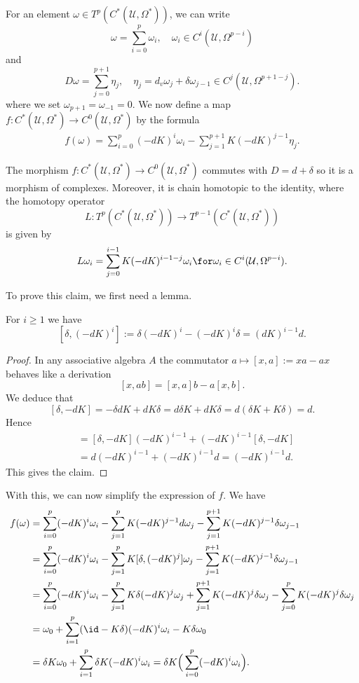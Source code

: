 For an element $\omega\in T^p(C^*(\mathcal{U},\Omega^*))$, we can write
\[\omega=\sum_{i=0}^{p}\omega_i,\quad \omega_i\in C^i(\mathcal{U},\Omega^{p-i})\]
and
\[D\omega=\sum_{j=0}^{p+1}\eta_j,\quad \eta_j=d_v\omega_j+\delta\omega_{j-1}\in C^j(\mathcal{U},\Omega^{p+1-j}).\]
where we set $\omega_{p+1}=\omega_{-1}=0$. We now define a map $f:C^*(\mathcal{U},\Omega^*)\to C^0(\mathcal{U},\Omega^*)$ by the formula
\begin{align}\label{collating formula def}
f(\omega)=\sum_{i=0}^{p}(-dK)^i\omega_i-\sum_{j=1}^{p+1}K(-dK)^{j-1}\eta_j.
\end{align}
\begin{proposition}\label{Cech de Rham collating formula}
The morphism $f:C^*(\mathcal{U},\Omega^*)\to C^0(\mathcal{U},\Omega^*)$ commutes with $D=d+\delta$ so it is a morphism of complexes. Moreover, it is chain homotopic to 
the identity, where the homotopy operator
\[L:T^p(C^*(\mathcal{U},\Omega^*))\to T^{p-1}(C^*(\mathcal{U},\Omega^*))\]
is given by
\[L\omega_i=\sum_{j=0}^{i-1}K(-dK)^{i-1-j}\omega_i\for \omega_i\in C^i(\mathcal{U},\Omega^{p-i}).\]
\end{proposition}
To prove this claim, we first need a lemma.
\begin{lemma}\label{collating formula lemma}
For $i\geq 1$ we have
\[[\delta,(-dK)^i]:=\delta(-dK)^i-(-dK)^i\delta=(dK)^{i-1}d.\]
\end{lemma}
\begin{proof}
In any associative algebra $A$ the commutator $a\mapsto[x,a]:=xa-ax$ behaves like a derivation
\[[x,ab]=[x,a]b-a[x,b].\]
We deduce that
\[[\delta,-dK]=-\delta dK+dK\delta=d\delta K+dK\delta=d(\delta K+K\delta)=d.\]
Hence
\begin{align*}
[\delta,(-dK)^i]&=[\delta,-dK](-dK)^{i-1}+(-dK)^{i-1}[\delta,-dK]\\
&=d(-dK)^{i-1}+(-dK)^{i-1}d=(-dK)^{i-1}d.
\end{align*}
This gives the claim.
\end{proof}
With this, we can now simplify the expression of $f$. We have
\begin{align*}
f(\omega)&=\sum_{i=0}^{p}(-dK)^i\omega_i-\sum_{j=1}^{p}K(-dK)^{j-1}d\omega_j-\sum_{j=1}^{p+1}K(-dK)^{j-1}\delta\omega_{j-1}\\
&=\sum_{i=0}^{p}(-dK)^i\omega_i-\sum_{j=1}^{p}K[\delta,(-dK)^j]\omega_j-\sum_{j=1}^{p+1}K(-dK)^{j-1}\delta\omega_{j-1}\\
&=\sum_{i=0}^{p}(-dK)^i\omega_i-\sum_{j=1}^{p}K\delta(-dK)^j\omega_j+\sum_{j=1}^{p+1}K(-dK)^j\delta\omega_j-\sum_{j=0}^{p}K(-dK)^{j}\delta\omega_{j}\\
&=\omega_0+\sum_{i=1}^{p}(\id-K\delta)(-dK)^i\omega_i-K\delta\omega_0\\
&=\delta K\omega_0+\sum_{i=1}^{p}\delta K(-dK)^i\omega_i=\delta K\Big(\sum_{i=0}^{p}(-dK)^i\omega_i\Big).
\end{align*}
